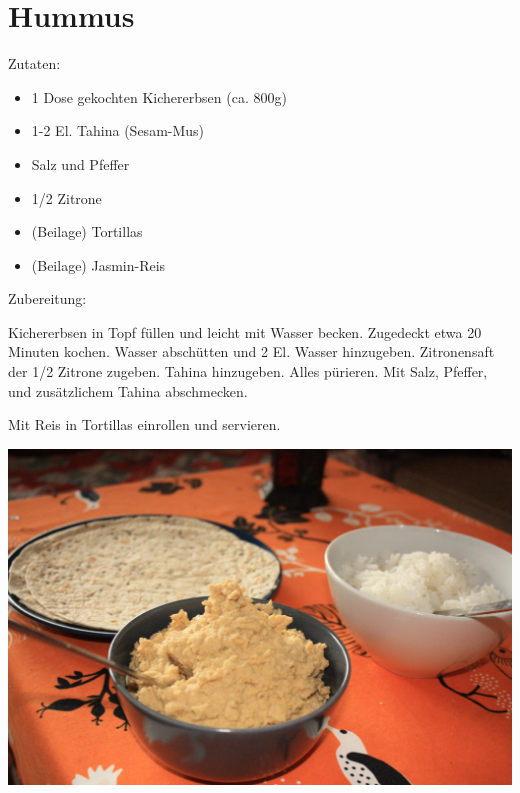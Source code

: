 \section{Hummus}
Zutaten:
\begin{itemize}
    \item 1 Dose gekochten Kichererbsen (ca. 800g)
    \item 1-2 El. Tahina (Sesam-Mus)
    \item Salz und Pfeffer
    \item 1/2 Zitrone
    \item (Beilage) Tortillas
    \item (Beilage) Jasmin-Reis
\end{itemize}


\noindent Zubereitung:

\noindent Kichererbsen in Topf füllen und leicht mit Wasser becken. Zugedeckt
etwa 20 Minuten kochen. Wasser abschütten und 2 El. Wasser hinzugeben.
Zitronensaft der 1/2 Zitrone zugeben. Tahina hinzugeben. Alles pürieren. Mit
Salz, Pfeffer, und zusätzlichem Tahina abschmecken.

Mit Reis in Tortillas einrollen und servieren.

\newpage
\mbox{}
\vfill
\begin{center}
    \includegraphics[width=\textwidth]{Hummus/IMG_6096_small.jpg}
\end{center}
\vfill
\mbox{ }
\newpage
